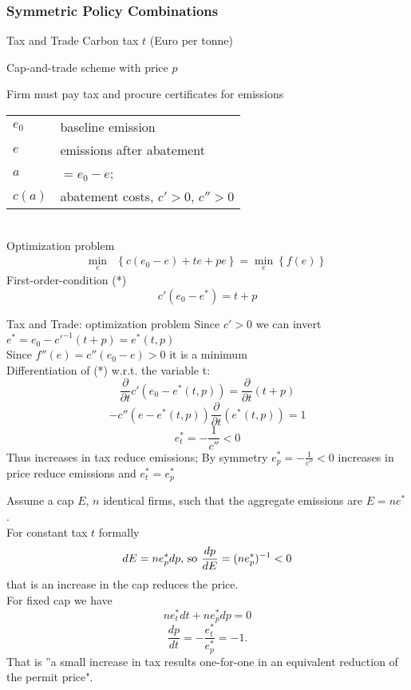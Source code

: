 \subsubsection{Symmetric Policy Combinations}

Tax and Trade
	Carbon tax $t$ (Euro per tonne)
	
	Cap-and-trade scheme with price $p$
	
	Firm must pay tax and procure certificates for emissions
		\begin{tabular}{ll}
		$e_0$ & baseline emission \\
		$e$ & emissions after abatement \\
		$a$ & $=e_0 - e$; \\
		$c(a)$ & abatement costs, $c' > 0$, $c'' > 0$ \\
		\end{tabular} \\
 Optimization problem
		\begin{align}
		\min_{e} & \left\{c(e_0-e)+te+pe\right\} = \min_{e}\left\{f(e)\right\}
		\end{align}
	First-order-condition (*)
		\[
		c'(e_0-e^*)=t+p
		\]



Tax and Trade: optimization problem
	Since $c'>0$ we can invert $e^*=e_0-c'^{-1}(t+p)=e^*(t,p)$ \\
	
	Since $f''(e)=c''(e_0-e)>0$ it is a minimum \\
	
	Differentiation of (*) w.r.t. the variable t:
		\[
		\frac{\partial}{\partial{t}}c'(e_0-e^*(t,p))=\frac{\partial}{\partial{t}}(t+p)
		\]
		\[
		-c''(e-e^*(t,p)) \frac{\partial}{\partial{t}} (e^*(t,p))=1
		\]
		\[
		e^*_t=-\frac{1}{c''} < 0
		\]
 Thus increases in tax reduce emissions; By symmetry $e^*_p = -\frac{1}{c''} < 0$ increases in price reduce emissions and $e^*_t=e^*_p$

	Assume a cap $E$, $n$ identical firms, such that the aggregate emissions are $E=ne^*$. \\
	For constant tax $t$ formally
		\[
		dE = ne^*_pdp \textnormal{, so } \frac{dp}{dE} = (ne^*_p)^{-1} < 0
		\]
	that is an increase in the cap reduces the price. \\

	For fixed cap we have
		\[
		ne^*_tdt+ne^*_pdp=0
		\]
		\[
		\frac{dp}{dt}=-\frac{e^*_t}{e^*_p}=-1.
		\]
	That is ''a small increase in tax results one-for-one in an equivalent reduction of the permit price". \\


